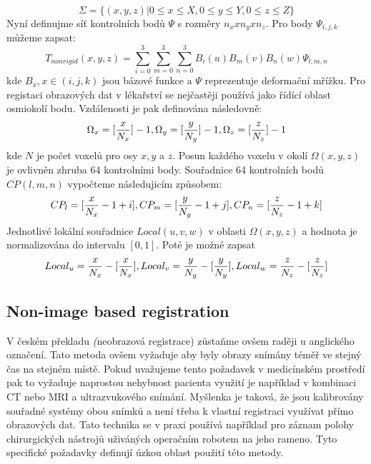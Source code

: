 \documentclass{thesis}%
\begin{document}
\begin{equation}
\Sigma = \{(x,y,z)|0 \leq x \leq X, 0 \leq y \leq Y, 0 \leq z \leq Z \}
\end{equation}
Nyní definujme síť kontrolních bodů $\Psi$ s rozměry $n_x x n_y x n_z$. Pro body $\Psi_{i,j,k}$ můžeme zapsat:
\begin{equation}
T_{nonrigid}(x,y,z)= \sum_{i=0}^3\sum_{m=0}^3\sum_{n=0}^3 B_i(u)B_m(v)B_n(w) \Psi_{l, m, n} 
\end{equation}
kde $B_x, x\in(i,j,k)$ jsou bázové funkce a $\Psi$ reprezentuje deformační mřížku. Pro registaci obrazových dat v lékařství se nejčastěji používá jako řídící oblast osmiokolí bodu. Vzdálenosti je pak definována následovně:
\begin{equation}
\Omega_x = [\frac{x}{N_x}]-1,\\
\Omega_y = [\frac{y}{N_y}]-1,\\
\Omega_z = [\frac{z}{N_z}]-1
\end{equation}
kde $N$ je počet voxelů pro osy $x,y$ a $z$. Posun každého voxelu v okolí $\Omega(x,y,z)$ je ovlivněn zhruba 64 kontrolními body. Souřadnice 64 kontrolních bodů $CP(l,m,n)$ vypočteme následujicím způsobem:
\begin{equation}
CP_l = [\frac{x}{N_x}-1+i],\\
CP_m = [\frac{y}{N_y}-1+j],\\
CP_n = [\frac{z}{N_z}-1+k]
\end{equation}
Jednotlivé lokální souřadnice $Local(u,v,w)$ v oblasti $\Omega(x,y,z)$ a hodnota je normalizována do intervalu $[0,1]$. Poté je možné zapsat
\begin{equation}
Local_u =\frac{x}{N_x}-[\frac{x}{N_x}],\\
Local_v =\frac{y}{N_y}-[\frac{y}{N_y}],\\
Local_w =\frac{z}{N_z}-[\frac{z}{N_z}]
\end{equation}

\subsection{Non-image based registration}
V českém překladu \textit(neobrazová registrace) zůstaňme ovšem raději u anglického označení. Tato metoda ovšem vyžaduje aby byly obrazy snímány téměř ve stejný čas na stejném místě. Pokud uvažujeme tento požadavek v medicínském prostředí pak to vyžaduje naprostou nehybnost pacienta využití je například v kombinaci CT nebo MRI a ultrazvukového snímání. Myšlenka je taková, že jsou kalibrovány souřadné systémy obou snímků a není třeba k vlastní registraci využívat přímo obrazových dat. Tato technika se v praxi používá například pro záznam polohy chirurgických nástrojů uživáných operačním robotem na jeho rameno. Tyto specifické požadavky definují úzkou oblast použití této metody. 
\end{document}
